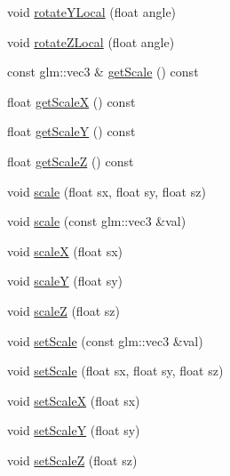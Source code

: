 \begin{DoxyCompactItemize}
void \mbox{\hyperlink{classec_1_1_transform3_d_abfc79987e5fc4c805c5ff479d2c8b624}{rotate\+Y\+Local}} (float angle)
\item 
void \mbox{\hyperlink{classec_1_1_transform3_d_a9079ea3fc1c171f2e70fb489c804fc52}{rotate\+Z\+Local}} (float angle)
\item 
const glm\+::vec3 \& \mbox{\hyperlink{classec_1_1_transform3_d_ab5f0e26d19bbb99a4624784d3024e654}{get\+Scale}} () const
\item 
float \mbox{\hyperlink{classec_1_1_transform3_d_a7ecc00577cd57f15ed63926a712cdcb1}{get\+ScaleX}} () const
\item 
float \mbox{\hyperlink{classec_1_1_transform3_d_a99763688e60bc36134390327344f5df0}{get\+ScaleY}} () const
\item 
float \mbox{\hyperlink{classec_1_1_transform3_d_ad79cc7092172c384e46b426059928672}{get\+ScaleZ}} () const
\item 
void \mbox{\hyperlink{classec_1_1_transform3_d_a3f4636cea71bac0aa965bc567e649e03}{scale}} (float sx, float sy, float sz)
\item 
void \mbox{\hyperlink{classec_1_1_transform3_d_a5ddb66479416948acf2406f544aaaa0f}{scale}} (const glm\+::vec3 \&val)
\item 
void \mbox{\hyperlink{classec_1_1_transform3_d_a3b859bc4f4b47e9d4b1e322c811a9e29}{scaleX}} (float sx)
\item 
void \mbox{\hyperlink{classec_1_1_transform3_d_a2b15e39c5a79379c361fb515a163c6de}{scaleY}} (float sy)
\item 
void \mbox{\hyperlink{classec_1_1_transform3_d_a61b556423d4c5dffd55f40685b0cb777}{scaleZ}} (float sz)
\item 
void \mbox{\hyperlink{classec_1_1_transform3_d_af8c2d1832acc0b0b52e217de4efa4d91}{set\+Scale}} (const glm\+::vec3 \&val)
\item 
void \mbox{\hyperlink{classec_1_1_transform3_d_a604f8cab4d669b713e04b57a7cc57c0c}{set\+Scale}} (float sx, float sy, float sz)
\item 
void \mbox{\hyperlink{classec_1_1_transform3_d_ada2c6aded239ad20e1c155a5dee60506}{set\+ScaleX}} (float sx)
\item 
void \mbox{\hyperlink{classec_1_1_transform3_d_a599ea97d84a88467abec94a30339f73e}{set\+ScaleY}} (float sy)
\item 
void \mbox{\hyperlink{classec_1_1_transform3_d_a1a71c829c953e5585623696fd7a4624d}{set\+ScaleZ}} (float sz)
\end{DoxyCompactItemize}
